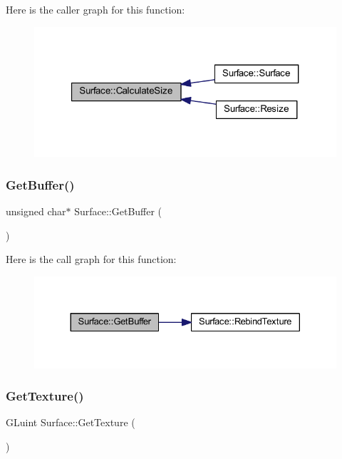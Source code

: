 Here is the caller graph for this function\+:\nopagebreak
\begin{figure}[H]
\begin{center}
\leavevmode
\includegraphics[width=321pt]{class_surface_aeb8a8540f415a4d29c440667e8532e91_icgraph}
\end{center}
\end{figure}
\mbox{\label{class_surface_a8f8da8f3ee82b8e657916f40b3f40eff}} 
\subsubsection{Get\+Buffer()}
{\footnotesize\ttfamily unsigned char$\ast$ Surface\+::\+Get\+Buffer (\begin{DoxyParamCaption}{ }\end{DoxyParamCaption})\hspace{0.3cm}{\ttfamily [inline]}}

Here is the call graph for this function\+:\nopagebreak
\begin{figure}[H]
\begin{center}
\leavevmode
\includegraphics[width=330pt]{class_surface_a8f8da8f3ee82b8e657916f40b3f40eff_cgraph}
\end{center}
\end{figure}
\mbox{\label{class_surface_a2cd8789d26457187b8af4be8c178e9d4}} 
\subsubsection{Get\+Texture()}
{\footnotesize\ttfamily G\+Luint Surface\+::\+Get\+Texture (\begin{DoxyParamCaption}{ }\end{DoxyParamCaption})}

